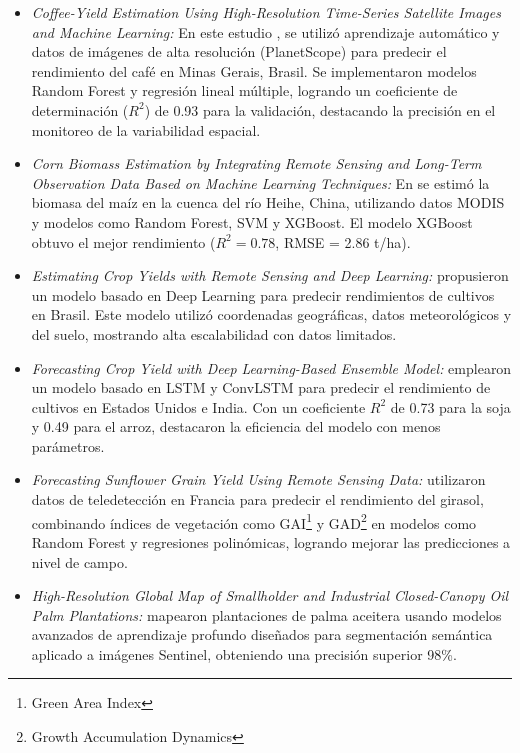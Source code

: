 \begin{itemize}

    \item \textit{Coffee-Yield Estimation Using High-Resolution Time-Series Satellite Images and Machine Learning:} En este estudio \cite{martello2022}, se utilizó aprendizaje automático y datos de imágenes de alta resolución (PlanetScope) para predecir el rendimiento del café en Minas Gerais, Brasil. Se implementaron modelos Random Forest y regresión lineal múltiple, logrando un coeficiente de determinación ($R^2$) de 0.93 para la validación, destacando la precisión en el monitoreo de la variabilidad espacial.

    \item \textit{Corn Biomass Estimation by Integrating Remote Sensing and Long-Term Observation Data Based on Machine Learning Techniques:} En \cite{geng2021} se estimó la biomasa del maíz en la cuenca del río Heihe, China, utilizando datos MODIS y modelos como Random Forest, SVM y XGBoost. El modelo XGBoost obtuvo el mejor rendimiento ($R^2 = 0.78$, RMSE = 2.86 t/ha).

    \item \textit{Estimating Crop Yields with Remote Sensing and Deep Learning:} \cite{cunha2020} propusieron un modelo basado en Deep Learning para predecir rendimientos de cultivos en Brasil. Este modelo utilizó coordenadas geográficas, datos meteorológicos y del suelo, mostrando alta escalabilidad con datos limitados.

    \item \textit{Forecasting Crop Yield with Deep Learning-Based Ensemble Model:} \cite{divakar2022} emplearon un modelo basado en LSTM y ConvLSTM para predecir el rendimiento de cultivos en Estados Unidos e India. Con un coeficiente $R^2$ de 0.73 para la soja y 0.49 para el arroz, destacaron la eficiencia del modelo con menos parámetros.

    \item \textit{Forecasting Sunflower Grain Yield Using Remote Sensing Data:} \cite{debaeke2023} utilizaron datos de teledetección en Francia para predecir el rendimiento del girasol, combinando índices de vegetación como GAI\footnote{Green Area Index} y GAD\footnote{Growth Accumulation Dynamics} en modelos como Random Forest y regresiones polinómicas, logrando mejorar las predicciones a nivel de campo.

    \item \textit{High-Resolution Global Map of Smallholder and Industrial Closed-Canopy Oil Palm Plantations:} \cite{descals2021} mapearon plantaciones de palma aceitera usando modelos avanzados de aprendizaje profundo diseñados para segmentación semántica aplicado a imágenes Sentinel, obteniendo una precisión superior 98\%.


\end{itemize}
